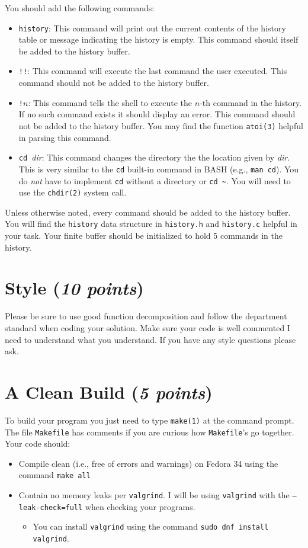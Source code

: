 \documentclass [12pt, letterpaper] {article}
\begin{document}
You should add the following commands:
\begin{itemize}
 \item {\tt history}: This command will print out the current contents of
       the history table or message indicating the history is empty. This
       command should itself be added to the history buffer.
 \item {\tt !!}: This command will execute the last command the user
       executed. This command should not be added to the history buffer.
 \item {\tt !$n$}: This command tells the shell to execute the $n$-th
       command in the history. If no such command exists it should display an
       error. This command should not be added to the history buffer. You may
       find the function {\tt atoi(3)} helpful in parsing this command.
 \item {\tt cd }\emph{dir}: This command changes the directory the the location
       given by \emph{dir}. This is very similar to the \texttt{cd} built-in command in
       BASH (e.g., {\tt man cd}). You do \emph{not} have to implement {\tt cd} without a directory
       or \verb#cd ~#. You will need to use the \texttt{chdir(2)} system call.
\end{itemize}
Unless otherwise noted, every command should be added to the history
buffer. You will find the {\tt history} data structure in {\tt history.h} and
 {\tt history.c} helpful in your task. Your finite buffer should be initialized
to hold 5 commands in the history.

\section*{Style (\emph{10 points})}
Please be sure to use good function decomposition and follow the department standard when coding your
solution. Make sure your code is well commented I need to understand
what you understand. If you have any style questions please ask.

\section*{A Clean Build (\emph{5 points})}
To build your program you just need to type {\tt make(1)} at the command prompt. The file {\tt Makefile} has comments
if you are curious how {\tt Makefile}'s go together. Your code should:
\begin{itemize}
 \item Compile clean (i.e., free of errors and warnings) on Fedora 34 using the command
 {\tt make all}
 \item Contain no memory leaks per \texttt{valgrind}. I will be using \texttt{valgrind} with the
       \texttt{--leak-check=full} when checking your programs.
       \begin{itemize}
         \item You can install \texttt{valgrind} using the command
         \verb|sudo dnf install valgrind|.
       \end{itemize}
\end{itemize}
\end{document}
